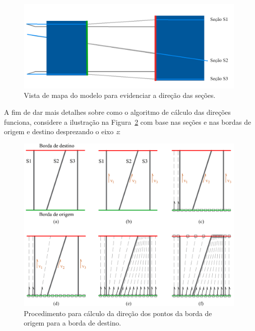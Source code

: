 \begin{figure} [H]
  \begin{center}
    \includegraphics[width=350pt]{images/fig-select-borders-3}
    \caption{Vista de mapa do modelo para evidenciar a direção das seções.}\label{fig-select-borders-3}
  \end{center}
\end{figure}

A fim de dar mais detalhes sobre como o algoritmo de cálculo das direções funciona, considere a ilustração na Figura~\ref{fig-select-borders-4} com base nas seções e nas bordas de origem e destino desprezando o eixo \textit{z}:

\begin{figure} [H]
  \begin{center}
    \includegraphics[width=370pt]{images/fig-select-borders-4}
    \caption{Procedimento para cálculo da direção dos pontos da borda de origem para a borda de destino.}\label{fig-select-borders-4}
  \end{center}
\end{figure}

